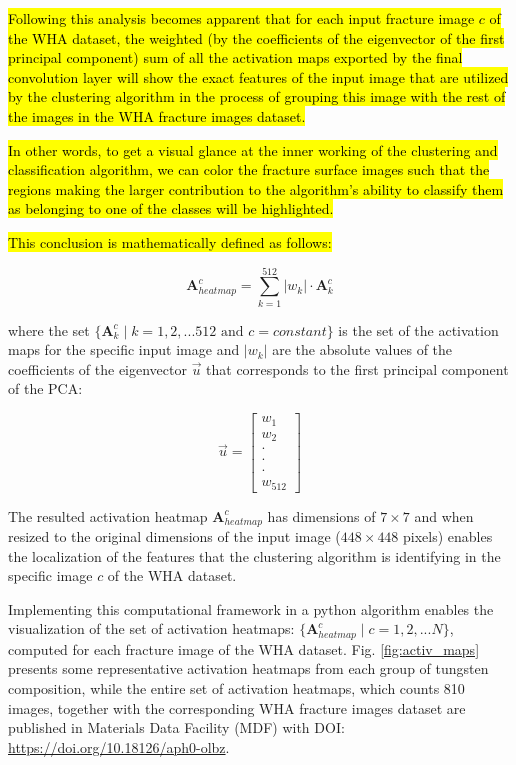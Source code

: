 \documentclass[authoryear,preprint,review,12pt, singleside]{elsarticle}
\begin{document}
\hl{Following this analysis becomes apparent that for each input fracture image $c$ of the WHA dataset, the weighted (by the coefficients of the eigenvector of the first principal component) sum of all the activation maps exported by the final convolution layer will show the exact features of the input image that are utilized by the clustering algorithm in the process of grouping this image with the rest of the images in the WHA fracture images dataset. }

\hl{In other words, to get a visual glance at the inner working of the clustering and classification algorithm, we can color the fracture surface images such that the regions making the larger contribution to the algorithm's ability to classify them as belonging to one of the classes will be highlighted. }

\hl{This conclusion is mathematically defined as follows:}

\begin{equation*}
\textbf{A}_{heatmap}^c = \sum_{k=1}^{512} |w_k| \cdot \textbf{A}^c_k 
\end{equation*}  

where the set  $\{\textbf{A}^c_k \; | \;  k=1,2, ... 512 \text{ and } c=constant\}$ is the set of the activation maps for the specific input image and  $|w_k|$ are the absolute values of the coefficients of the eigenvector $\vec{u}$ that corresponds to the first principal component of the PCA:

\begin{equation*}
\vec{u} = \begin{bmatrix}  w_1 \\
						   w_2 \\
						  \cdot \\
						  \cdot \\
						  \cdot \\
						  w_{512}
		   \end{bmatrix}
\end{equation*}

The resulted activation heatmap $\textbf{A}_{heatmap}^c$ has dimensions of $7 \times 7$ and when resized to the original dimensions of the input image ($448 \times 448$ pixels) enables the localization of the features that the clustering algorithm is identifying in the specific image $c$ of the WHA dataset.

Implementing this computational framework in a python algorithm enables the visualization of the set of activation heatmaps: $\{\textbf{A}_{heatmap}^c \; | \; c=1,2, ... N\}$, computed for each fracture image of the WHA dataset. Fig. \ref{fig:activ_maps} presents some representative activation heatmaps from each group of tungsten composition, while the entire set of activation heatmaps, which counts 810 images, together with the corresponding WHA fracture images dataset are published in Materials Data Facility (MDF) with DOI: \url{https://doi.org/10.18126/aph0-olbz}. 
\end{document}
